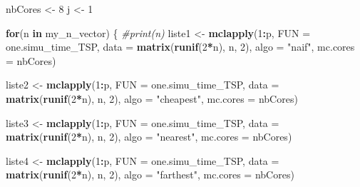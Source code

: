 \documentclass[
]{article}
\newenvironment{Shaded}{\begin{snugshade}}{\end{snugshade}}
\newcommand{\AttributeTok}[1]{\textcolor[rgb]{0.13,0.29,0.53}{#1}}
\newcommand{\CommentTok}[1]{\textcolor[rgb]{0.56,0.35,0.01}{\textit{#1}}}
\newcommand{\ControlFlowTok}[1]{\textcolor[rgb]{0.13,0.29,0.53}{\textbf{#1}}}
\newcommand{\DecValTok}[1]{\textcolor[rgb]{0.00,0.00,0.81}{#1}}
\newcommand{\FunctionTok}[1]{\textcolor[rgb]{0.13,0.29,0.53}{\textbf{#1}}}
\newcommand{\NormalTok}[1]{#1}
\newcommand{\OtherTok}[1]{\textcolor[rgb]{0.56,0.35,0.01}{#1}}
\newcommand{\SpecialCharTok}[1]{\textcolor[rgb]{0.81,0.36,0.00}{\textbf{#1}}}
\newcommand{\StringTok}[1]{\textcolor[rgb]{0.31,0.60,0.02}{#1}}
\begin{document}
\begin{Shaded}
\begin{Highlighting}[]
\NormalTok{nbCores }\OtherTok{\textless{}{-}} \DecValTok{8}
\NormalTok{j }\OtherTok{\textless{}{-}} \DecValTok{1}

\ControlFlowTok{for}\NormalTok{(n }\ControlFlowTok{in}\NormalTok{ my\_n\_vector)}
\NormalTok{\{}
  \CommentTok{\#print(n)}
\NormalTok{  liste1 }\OtherTok{\textless{}{-}} \FunctionTok{mclapply}\NormalTok{(}\DecValTok{1}\SpecialCharTok{:}\NormalTok{p, }\AttributeTok{FUN =}\NormalTok{ one.simu\_time\_TSP,}
                      \AttributeTok{data =} \FunctionTok{matrix}\NormalTok{(}\FunctionTok{runif}\NormalTok{(}\DecValTok{2}\SpecialCharTok{*}\NormalTok{n), n, }\DecValTok{2}\NormalTok{),}
                     \AttributeTok{algo =} \StringTok{"naif"}\NormalTok{,}
                     \AttributeTok{mc.cores =}\NormalTok{ nbCores)}

\NormalTok{  liste2 }\OtherTok{\textless{}{-}} \FunctionTok{mclapply}\NormalTok{(}\DecValTok{1}\SpecialCharTok{:}\NormalTok{p, }\AttributeTok{FUN =}\NormalTok{ one.simu\_time\_TSP,}
                     \AttributeTok{data =} \FunctionTok{matrix}\NormalTok{(}\FunctionTok{runif}\NormalTok{(}\DecValTok{2}\SpecialCharTok{*}\NormalTok{n), n, }\DecValTok{2}\NormalTok{),}
                     \AttributeTok{algo =} \StringTok{"cheapest"}\NormalTok{,}
                     \AttributeTok{mc.cores =}\NormalTok{ nbCores)}

\NormalTok{  liste3 }\OtherTok{\textless{}{-}} \FunctionTok{mclapply}\NormalTok{(}\DecValTok{1}\SpecialCharTok{:}\NormalTok{p, }\AttributeTok{FUN =}\NormalTok{ one.simu\_time\_TSP,}
                     \AttributeTok{data =} \FunctionTok{matrix}\NormalTok{(}\FunctionTok{runif}\NormalTok{(}\DecValTok{2}\SpecialCharTok{*}\NormalTok{n), n, }\DecValTok{2}\NormalTok{),}
                     \AttributeTok{algo =} \StringTok{"nearest"}\NormalTok{,}
                     \AttributeTok{mc.cores =}\NormalTok{ nbCores)}

\NormalTok{  liste4 }\OtherTok{\textless{}{-}} \FunctionTok{mclapply}\NormalTok{(}\DecValTok{1}\SpecialCharTok{:}\NormalTok{p, }\AttributeTok{FUN =}\NormalTok{ one.simu\_time\_TSP,}
                     \AttributeTok{data =} \FunctionTok{matrix}\NormalTok{(}\FunctionTok{runif}\NormalTok{(}\DecValTok{2}\SpecialCharTok{*}\NormalTok{n), n, }\DecValTok{2}\NormalTok{),}
                     \AttributeTok{algo =} \StringTok{"farthest"}\NormalTok{,}
                     \AttributeTok{mc.cores =}\NormalTok{ nbCores)}


\end{Highlighting}
\end{Shaded}
\end{document}
